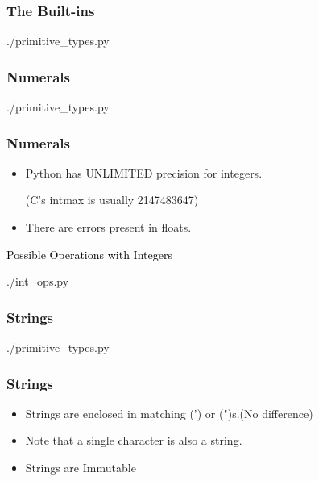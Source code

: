 \documentclass{beamer}
\begin{document}
\begin{frame}
  \frametitle{The Built-ins}
    \begin{lstinputlisting}
      {./primitive_types.py}
    \end{lstinputlisting}
\end{frame}

\begin{frame}
  \frametitle{Numerals}
    \begin{lstinputlisting}[firstline=1, lastline=6]
      {./primitive_types.py}
    \end{lstinputlisting}
\end{frame}

\begin{frame}
  \frametitle{Numerals}
  \begin{itemize}
    \item Python has \alert{UNLIMITED} precision for integers.

      (C's intmax is usually 2147483647)
    \item There are errors present in floats.
  \end{itemize}

\end{frame}

\begin{frame}
  \textcolor{black}{\large{Possible Operations with Integers}}
    \begin{lstinputlisting}
      {./int_ops.py}
    \end{lstinputlisting}
\end{frame}

\begin{frame}
  \frametitle{Strings}
    \begin{lstinputlisting}[firstline=8, lastline=12]
      {./primitive_types.py}
    \end{lstinputlisting}

\end{frame}

\begin{frame}
  \frametitle{Strings}
  \begin{itemize}
    \item Strings are enclosed in matching (') or (")s.(No difference)
    \item Note that a single character is also a string.
    \item Strings are Immutable
  \end{itemize}
\end{frame}
\end{document}
